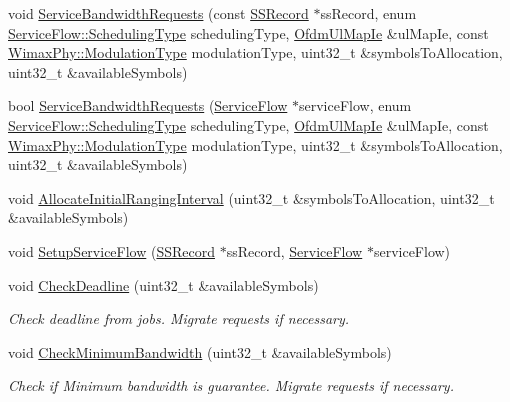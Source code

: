 \begin{DoxyCompactItemize}
\item 
void \hyperlink{classns3_1_1UplinkSchedulerMBQoS_a2405968bd60de182ce1e3d67ae416ba7}{Service\+Bandwidth\+Requests} (const \hyperlink{classns3_1_1SSRecord}{S\+S\+Record} $\ast$ss\+Record, enum \hyperlink{classns3_1_1ServiceFlow_a7990ba10be1e098328fd1e6382a26235}{Service\+Flow\+::\+Scheduling\+Type} scheduling\+Type, \hyperlink{classns3_1_1OfdmUlMapIe}{Ofdm\+Ul\+Map\+Ie} \&ul\+Map\+Ie, const \hyperlink{classns3_1_1WimaxPhy_a044c5d8a48ca992c39c2a946f6e755fa}{Wimax\+Phy\+::\+Modulation\+Type} modulation\+Type, uint32\+\_\+t \&symbols\+To\+Allocation, uint32\+\_\+t \&available\+Symbols)
\item 
bool \hyperlink{classns3_1_1UplinkSchedulerMBQoS_a366a69170776175fcf651cb29e46fdf4}{Service\+Bandwidth\+Requests} (\hyperlink{classns3_1_1ServiceFlow}{Service\+Flow} $\ast$service\+Flow, enum \hyperlink{classns3_1_1ServiceFlow_a7990ba10be1e098328fd1e6382a26235}{Service\+Flow\+::\+Scheduling\+Type} scheduling\+Type, \hyperlink{classns3_1_1OfdmUlMapIe}{Ofdm\+Ul\+Map\+Ie} \&ul\+Map\+Ie, const \hyperlink{classns3_1_1WimaxPhy_a044c5d8a48ca992c39c2a946f6e755fa}{Wimax\+Phy\+::\+Modulation\+Type} modulation\+Type, uint32\+\_\+t \&symbols\+To\+Allocation, uint32\+\_\+t \&available\+Symbols)
\item 
void \hyperlink{classns3_1_1UplinkSchedulerMBQoS_a6a9a487024bc6253cb5cada269994d24}{Allocate\+Initial\+Ranging\+Interval} (uint32\+\_\+t \&symbols\+To\+Allocation, uint32\+\_\+t \&available\+Symbols)
\item 
void \hyperlink{classns3_1_1UplinkSchedulerMBQoS_aef30b9e41f2b8da83b467c6a8121b34d}{Setup\+Service\+Flow} (\hyperlink{classns3_1_1SSRecord}{S\+S\+Record} $\ast$ss\+Record, \hyperlink{classns3_1_1ServiceFlow}{Service\+Flow} $\ast$service\+Flow)
\item 
void \hyperlink{classns3_1_1UplinkSchedulerMBQoS_a3f8e2b0a22540ea61354cf4147187399}{Check\+Deadline} (uint32\+\_\+t \&available\+Symbols)
\begin{DoxyCompactList}\small\item\em Check deadline from jobs. Migrate requests if necessary. \end{DoxyCompactList}\item 
void \hyperlink{classns3_1_1UplinkSchedulerMBQoS_ae25c9cfb244144f5f9e2b7393253d009}{Check\+Minimum\+Bandwidth} (uint32\+\_\+t \&available\+Symbols)
\begin{DoxyCompactList}\small\item\em Check if Minimum bandwidth is guarantee. Migrate requests if necessary. \end{DoxyCompactList}\item 

\end{DoxyCompactItemize}
